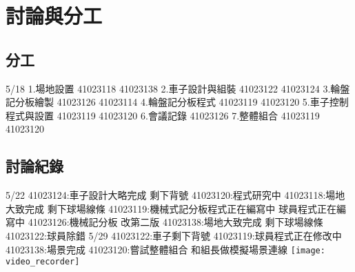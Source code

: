 \chapter{討論與分工}
\renewcommand{\baselinestretch}{10.0} %
\setcounter{page}{1}  %
\fontsize{14pt}{2.5pt}\sectionef
\section{分工}
5/18
1.場地設置 41023118 41023138
2.車子設計與組裝 41023122 41023124
3.輪盤記分板繪製 41023126 41023114
4.輪盤記分板程式 41023119 41023120
5.車子控制程式與設置 41023119 41023120
6.會議記錄 41023126
7.整體組合 41023119 41023120
\section{討論紀錄}
5/22 
41023124:車子設計大略完成 剩下背號
41023120:程式研究中
41023118:場地大致完成 剩下球場線條
41023119:機械式記分板程式正在編寫中 球員程式正在編寫中
41023126:機械記分板 改第二版
41023138:場地大致完成 剩下球場線條
41023122:球員除錯
5/29
41023122:車子剩下背號
41023119:球員程式正在修改中
41023138:場景完成
41023120:嘗試整體組合
和組長做模擬場景連線
\texttt{[image: video\_recorder]}
\begin{enumerate}
\end{enumerate}
\renewcommand{\baselinestretch}{0.5} %